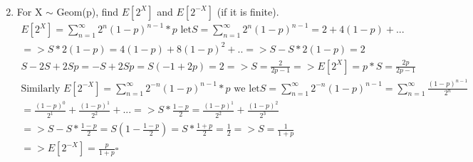 \documentclass[11pt]{article}
\begin{document}
\begin{enumerate}
\begin{gather}
\end{gather}
\item For X $\sim$ Geom(p), find $E[2^X]$ and $E[2^{-X}]$ (if it is finite).
\begin{gather} 
E[2^X] =\sum_{n=1}^{\infty} 2^n (1-p)^{n-1}*p \text{ let} S = \sum_{n=1}^{\infty} 2^n (1-p)^{n-1} = 2 + 4(1-p) +... \\
=>S*2(1-p) = 4(1-p) + 8(1-p)^2 + .. => S-S*2(1-p) = 2\\
S-2S+2Sp = -S+2Sp = S(-1 + 2p) = 2 => S = \frac{2}{2p-1} =>E[2^X]=p*S = \frac{2p}{2p-1} \\
\text{Similarly  }
E[2^{-X}] = \sum_{n=1}^{\infty} 2^{-n} (1-p)^{n-1}*p \text{ we let} S =\sum_{n=1}^{\infty} 2^{-n} (1-p)^{n-1} = \sum_{n=1}^{\infty} \frac{(1-p)^{n-1}}{2^n}\\
= \frac{(1-p)^{0}}{2^1} + \frac{(1-p)^{1}}{2^2} + ... => S*\frac{1-p}{2} = \frac{(1-p)^{1}}{2^2} + \frac{(1-p)^{2}}{2^3} \\
=> S-S*\frac{1-p}{2} = S(1-\frac{1-p}{2}) = S * \frac{1+p}{2} = \frac{1}{2} => S = \frac{1}{1+p}\\
=> E[2^{-X}] = \frac{p}{1+p} \square
\end{gather}
\end{enumerate}
\end{document}

